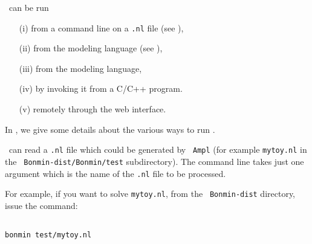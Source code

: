 
\begin{PageSummary}
\end{PageSummary}

\begin{quickref}
\end{quickref}


\Bonmin\ can be run
\begin{itemize}
\item [(i)] from a command line on a {\tt .nl} file
(see ),
\item [(ii)] from the modeling language  (see
),
\item[(iii)] from the  modeling language,
\item [(iv)] by invoking it from a C/C++ program.
\item[(v)] remotely through the  web interface.
\end{itemize}

In , we give some details about the
various ways to run \Bonmin.

\Bonmin\ can read a {\tt .nl} file which could be generated by {\tt
Ampl} (for example {\tt mytoy.nl} in the {\tt
Bonmin-dist/Bonmin/test} subdirectory). The command line takes just
one argument which is the name of the {\tt .nl} file to be
processed.

For example, if you want to solve {\tt mytoy.nl}, from the {\tt
Bonmin-dist} directory, issue the command:

\begin{colorverb}
\begin{verbatim}

bonmin test/mytoy.nl

\end{verbatim}
\end{colorverb}

